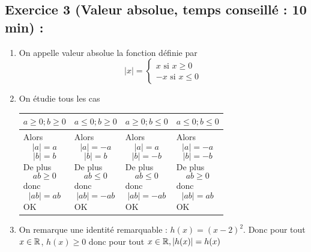 \subsection*{Exercice 3 (Valeur absolue, temps conseillé : 10 min) : }
\begin{enumerate}
\item On appelle valeur absolue la fonction définie par 
$$|x| = \left\{\begin{array}{l}x \text{ si } x \geq 0 \\ -x \text{ si } x\leq 0\end{array}\right.$$
\item On étudie tous les cas \newline

\begin{tabularx}{\linewidth}{| X | X | X | X |}
\hline
$a \geq 0; b \geq 0$ & $a \leq 0; b \geq 0$ & $a \geq 0; b \leq 0$ & $a \leq 0; b \leq 0$ \\ \hline
Alors $$|a| = a$$ $$|b| = b$$ De plus $$ab \geq 0$$ donc $$|ab| = ab$$ OK & Alors $$|a| = -a$$ $$|b| = b$$ De plus $$ab \leq 0$$ donc $$|ab| = -ab$$ OK & Alors $$|a| = a$$ $$|b| = -b$$ De plus $$ab \leq 0$$ donc $$|ab| = -ab$$ OK & Alors $$|a| = -a$$ $$|b| = -b$$ De plus $$ab \geq 0$$ donc $$|ab| = ab$$ OK\\ \hline
\end{tabularx}
\item On remarque une identité remarquable : $h(x) = (x-2)^2$. Donc pour tout $x\in \mathbb{R}$, $h(x) \geq 0$ donc pour tout $x\in \mathbb{R}, |h(x)| = h(x)$
\end{enumerate}
